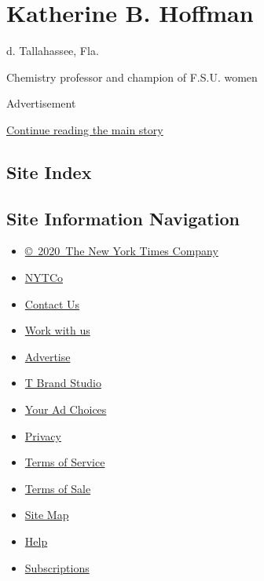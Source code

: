 \hypertarget{katherine-b-hoffman}{%
\section{Katherine B. Hoffman}\label{katherine-b-hoffman}}

d. Tallahassee, Fla.

Chemistry professor and champion of F.S.U. women

Advertisement

\protect\hyperlink{after-bottom}{Continue reading the main story}

\hypertarget{site-index}{%
\subsection{Site Index}\label{site-index}}

\hypertarget{site-information-navigation}{%
\subsection{Site Information
Navigation}\label{site-information-navigation}}

\begin{itemize}
\tightlist
\item
  \href{https://help.nytimes3xbfgragh.onion/hc/en-us/articles/115014792127-Copyright-notice}{©~2020~The
  New York Times Company}
\end{itemize}

\begin{itemize}
\tightlist
\item
  \href{https://www.nytco.com/}{NYTCo}
\item
  \href{https://help.nytimes3xbfgragh.onion/hc/en-us/articles/115015385887-Contact-Us}{Contact
  Us}
\item
  \href{https://www.nytco.com/careers/}{Work with us}
\item
  \href{https://nytmediakit.com/}{Advertise}
\item
  \href{http://www.tbrandstudio.com/}{T Brand Studio}
\item
  \href{https://www.nytimes3xbfgragh.onion/privacy/cookie-policy\#how-do-i-manage-trackers}{Your
  Ad Choices}
\item
  \href{https://www.nytimes3xbfgragh.onion/privacy}{Privacy}
\item
  \href{https://help.nytimes3xbfgragh.onion/hc/en-us/articles/115014893428-Terms-of-service}{Terms
  of Service}
\item
  \href{https://help.nytimes3xbfgragh.onion/hc/en-us/articles/115014893968-Terms-of-sale}{Terms
  of Sale}
\item
  \href{https://spiderbites.nytimes3xbfgragh.onion}{Site Map}
\item
  \href{https://help.nytimes3xbfgragh.onion/hc/en-us}{Help}
\item
  \href{https://www.nytimes3xbfgragh.onion/subscription?campaignId=37WXW}{Subscriptions}
\end{itemize}

